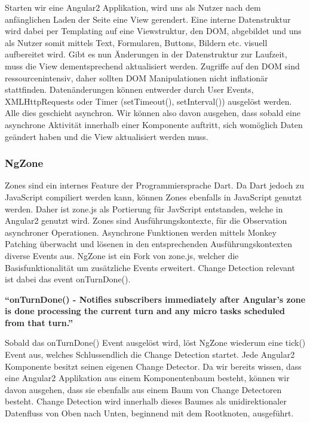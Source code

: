 Starten wir eine Angular2 Applikation, wird uns als Nutzer nach dem anfänglichen Laden der Seite eine View gerendert.
Eine interne Datenstruktur wird dabei per Templating auf eine Viewstruktur, den DOM, abgebildet und uns als Nutzer somit mittels Text,
Formularen, Buttons, Bildern etc. visuell aufbereitet wird.
Gibt es nun Änderungen in der Datenstruktur zur Laufzeit, muss die View dementsprechend aktualisiert werden.
Zugriffe auf den DOM sind ressourcenintensiv, daher sollten DOM Manipulationen nicht inflationär stattfinden.
Datenänderungen können entwerder durch User Events, XMLHttpRequests oder Timer (setTimeout(), setInterval()) ausgelöst werden.
Alle dies geschieht asynchron. Wir können also davon ausgehen, dass sobald eine asynchrone Aktivität innerhalb einer Komponente auftritt,
sich womöglich Daten geändert haben und die View aktualisiert werden muss.
\cite{changedetection-explained}

\subsubsection{NgZone}

Zones sind ein internes Feature der Programmiersprache Dart. Da Dart jedoch zu JavaScript compiliert werden kann,
können Zones ebenfalls in JavaScript genutzt werden. Daher ist zone.js als Portierung für JavScript entstanden, welche in Angular2 genutzt wird.
Zones sind Ausführungskontexte, für die Observation asynchroner Operationen.
Asynchrone Funktionen werden mittels Monkey Patching überwacht und lösenen in den entsprechenden Ausführungskontexten diverse Events aus.
NgZone ist ein Fork von zone.js, welcher die Basisfunktionalität um zusätzliche Events erweitert.
Change Detection relevant ist dabei das event onTurnDone().
\cite{changedetection-explained}

\vspace{0.5cm}
\textbf{``onTurnDone() - Notifies subscribers immediately after Angular’s zone is done processing the current turn and any micro tasks scheduled from that turn.''}
\cite{ZONESINANGULAR2}
\vspace{0.5cm}

Sobald das onTurnDone() Event ausgelöst wird, löst NgZone wiederum eine tick() Event aus, welches Schlussendlich die Change Detection startet.
Jede Angular2 Komponente besitzt seinen eigenen Change Detector. Da wir bereits wissen, dass eine Angular2 Applikation aus einem Komponentenbaum besteht,
können wir davon ausgehen, dass sie ebenfalls aus einem Baum von Change Detectoren besteht.
Change Detection wird innerhalb dieses Baumes als unidirektionaler Datenfluss von Oben nach Unten, beginnend mit dem Rootknoten, ausgeführt.

